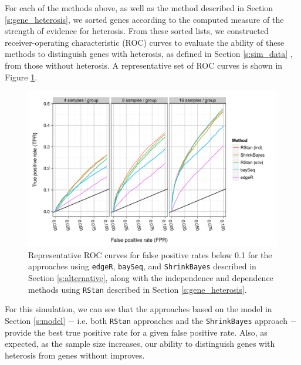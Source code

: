\documentclass[useAMS,usenatbib,referee]{biom}
\begin{document}
For each of the methods above, as well as the method described in Section \ref{s:gene_heterosis}, we sorted genes according to the computed measure of the strength of evidence for heterosis. From these sorted lists, we constructed receiver-operating characteristic (ROC) curves to evaluate the ability of these methods to distinguish genes with heterosis, as defined in Section \ref{s:sim_data}  \citep{landau2013dispersion}, 
from those without heterosis. A representative set of ROC curves is shown in Figure \ref{f:roc}. 
\begin{figure}[htbp]
\centerline{\includegraphics[width=\textwidth]{exampleROC0_1}}
\caption{Representative ROC curves for false positive rates below 0.1 for the approaches using {\tt edgeR}, {\tt baySeq},  and {\tt ShrinkBayes} described in Section \ref{s:alternative}, along with the independence and dependence methods using {\tt RStan} described in Section \ref{s:gene_heterosis}.}
\label{f:roc}
\end{figure}
For this simulation, we can see that the approaches based on the model in Section \ref{s:model} $-$ i.e. both {\tt RStan} approaches and the {\tt ShrinkBayes} approach $-$ provide the best true positive rate for a given false positive rate. Also, as expected, as the sample size increases, our ability to distinguish genes with heterosis from genes without improves.
\end{document}
